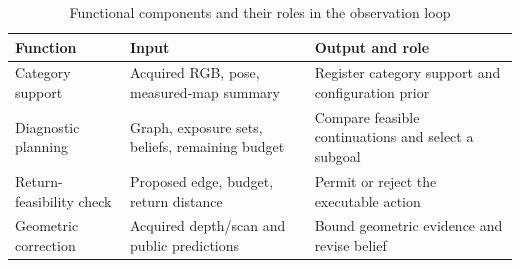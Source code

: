 \begin{table}[!htbp]
\caption{Functional components and their roles in the observation loop}\label{tab:1}
\small\renewcommand{\arraystretch}{1.12}\setlength{\tabcolsep}{3pt}
\setlength{\JournalTableWidth}{\dimexpr\linewidth-4\tabcolsep\relax}
\begin{tabular}{@{}>{\raggedright\arraybackslash}p{0.16\JournalTableWidth} >{\raggedright\arraybackslash}p{0.32\JournalTableWidth} >{\raggedright\arraybackslash}p{0.52\JournalTableWidth}@{}}
\toprule
Function & Input & Output and role \\
\midrule
Category support & Acquired RGB, pose, measured-map summary & Register category support and configuration prior \\
Diagnostic planning & Graph, exposure sets, beliefs, remaining budget & Compare feasible continuations and select a subgoal \\
Return-feasibility check & Proposed edge, budget, return distance & Permit or reject the executable action \\
Geometric correction & Acquired depth/scan and public predictions & Bound geometric evidence and revise belief \\
\bottomrule
\end{tabular}
\end{table}

